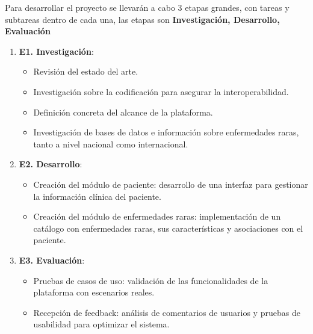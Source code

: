 \documentclass{article}
\begin{document}
Para desarrollar el proyecto se llevarán a cabo 3 etapas grandes, con tareas y subtareas dentro de cada una, las etapas son \textbf{Investigación, Desarrollo, Evaluación}
\begin{enumerate}[leftmargin=1.2em]
  \item \textbf{E1. Investigación}:
    \begin{itemize}
        \item Revisión del estado del arte.
        \item Investigación sobre la codificación para asegurar la interoperabilidad.
        \item Definición concreta del alcance de la plataforma.
        \item Investigación de bases de datos e información sobre enfermedades raras, tanto a nivel nacional como internacional.
    \end{itemize}

  \item \textbf{E2. Desarrollo}:
    \begin{itemize}
        \item Creación del módulo de paciente: desarrollo de una interfaz para gestionar la información clínica del paciente.
        \item Creación del módulo de enfermedades raras: implementación de un catálogo con enfermedades raras, sus características y asociaciones con el paciente.
    \end{itemize}
  
  \item \textbf{E3. Evaluación}:
    \begin{itemize}
        \item Pruebas de casos de uso: validación de las funcionalidades de la plataforma con escenarios reales.
        \item Recepción de feedback: análisis de comentarios de usuarios y pruebas de usabilidad para optimizar el sistema.
    \end{itemize}
\end{enumerate}
\end{document}
